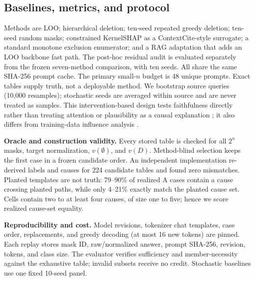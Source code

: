 \documentclass{article}
\begin{document}
\subsection{Baselines, metrics, and protocol}

Methods are LOO; hierarchical deletion; ten-seed repeated greedy deletion; ten-
seed random masks; constrained KernelSHAP as a ContextCite-style surrogate;
a standard monotone exclusion enumerator; and a RAG adaptation that adds an LOO
backbone fast path. The post-hoc residual audit is evaluated separately from the
frozen seven-method comparison, with ten seeds. All share the same SHA-256 prompt cache. The primary small-$n$
budget is 48 unique prompts. Exact tables supply truth, not a deployable method.
We bootstrap source queries (10,000 resamples); stochastic seeds are averaged
within source and are never treated as samples. This intervention-based design
tests faithfulness directly rather than treating attention or plausibility as a
causal explanation \cite{jain2019,jacovi2020}; it also differs from training-data
influence analysis \cite{koh2017}.

\textbf{Oracle and construction validity.} Every stored table is checked for
all $2^n$ masks, target normalization, $v(\emptyset)$, and $v(D)$. Method-blind
selection keeps the first case in a frozen candidate order. An independent
implementation re-derived labels and causes for 224 candidate tables and found
zero mismatches. Planted templates are not truth: 79--90\% of realized A cases
contain a cause crossing planted paths, while only 4--21\% exactly match the
planted cause set. Cells contain two to at least four causes, of size one to
five; hence we score realized cause-set equality.

\textbf{Reproducibility and cost.} Model revisions, tokenizer chat templates,
case order, replacements, and greedy decoding (at most 16 new tokens) are
pinned. Each replay stores mask ID, raw/normalized answer, prompt SHA-256,
revision, tokens, and class size. The evaluator verifies sufficiency and
member-necessity against the exhaustive table; invalid subsets receive no
credit. Stochastic baselines use one fixed 10-seed panel.
\end{document}
